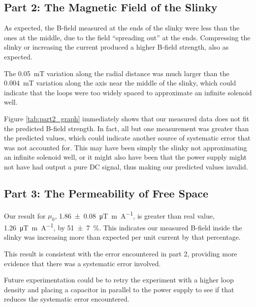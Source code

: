 \documentclass[a4paper]{scrartcl}
\begin{document}
\subsection{Part 2: The Magnetic Field of the Slinky}
As expected, the B-field measured at the ends of the slinky were less than the ones at the middle, due to the field ``spreading out'' at the ends. Compressing the slinky or increasing the current produced a higher B-field strength, also as expected.

The \SI{0.05}{\milli\tesla} variation along the radial distance was much larger than the \SI{0.004}{\milli\tesla} variation along the axis near the middle of the slinky, which could indicate that the loops were too widely spaced to approximate an infinite solenoid well.

Figure \ref{tab:part2_graph} immediately shows that our measured data does not fit the predicted B-field strength. In fact, all but one measurement was greater than the predicted values, which could indicate another source of systematic error that was not accounted for. This may have been simply the slinky not approximating an infinite solenoid well, or it might also have been that the power supply might not have had output a pure DC signal, thus making our predicted values invalid.

\subsection{Part 3: The Permeability of Free Space}
Our result for \(\mu_0\), \SI{1.86 \pm 0.08}{\micro\tesla\metre\per\ampere}, is greater than real value, \SI{1.26}{\micro\tesla\metre\per\ampere}, by \SI{51 \pm 7}{\percent}. This indicates our measured B-field inside the slinky was increasing more than expected per unit current by that percentage.

This result is consistent with the error encountered in part 2, providing more evidence that there was a systematic error involved.

Future experimentation could be to retry the experiment with a higher loop density and placing a capacitor in parallel to the power supply to see if that reduces the systematic error encountered.
\end{document}

